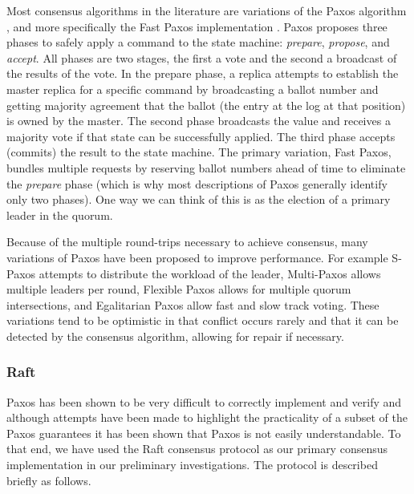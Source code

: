 \documentclass{article}
\begin{document}
Most consensus algorithms in the literature are variations of the Paxos algorithm \cite{lamport_paxos_2001}, and more specifically the Fast Paxos implementation \cite{lamport_fast_2006}. Paxos proposes three phases to safely apply a command to the state machine: \textit{prepare}, \textit{propose}, and \textit{accept}. All phases are two stages, the first a vote and the second a broadcast of the results of the vote. In the prepare phase, a replica attempts to establish the master replica for a specific command by broadcasting a ballot number and getting majority agreement that the ballot (the entry at the log at that position) is owned by the master. The second phase broadcasts the value and receives a majority vote if that state can be successfully applied. The third phase accepts (commits) the result to the state machine. The primary variation, Fast Paxos, bundles multiple requests by reserving ballot numbers ahead of time to eliminate the \textit{prepare} phase (which is why most descriptions of Paxos generally identify only two phases). One way we can think of this is as the election of a primary leader in the quorum.

Because of the multiple round-trips necessary to achieve consensus, many variations of Paxos have been proposed to improve performance. For example S-Paxos \cite{biely_s-paxos:_2012} attempts to distribute the workload of the leader, Multi-Paxos \cite{camargos_multicoordinated_2007} allows multiple leaders per round, Flexible Paxos \cite{2016arXiv160806696H} allows for multiple quorum intersections, and Egalitarian Paxos \cite{moraru_egalitarian_2012,moraru_there_2013} allow fast and slow track voting. These variations tend to be optimistic in that conflict occurs rarely and that it can be detected by the consensus algorithm, allowing for repair if necessary.

\subsubsection{Raft}

Paxos has been shown to be very difficult to correctly implement and verify \cite{chandra_paxos_2007} and although attempts have been made to highlight the practicality of a subset of the Paxos guarantees \cite{mazieres_paxos_2007} it has been shown that Paxos is not easily understandable. To that end, we have used the Raft consensus protocol \cite{ongaro_search_2014,howard_raft_2015} as our primary consensus implementation in our preliminary investigations. The protocol is described briefly as follows.
\end{document}
